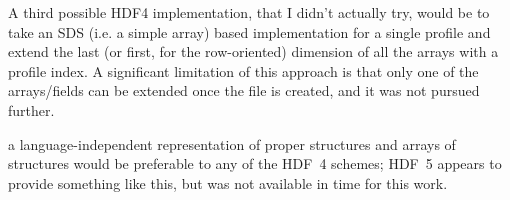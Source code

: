 \documentclass[12pt]{article}
\begin{document}
A third possible HDF4 implementation, that I didn't actually try,
would be to take an SDS (i.e. a simple array) based implementation
for a single profile and extend the last (or first, for the
row-oriented) dimension of all the arrays with a profile index.  A
significant limitation of this approach is that only one of the
arrays/fields can be extended once the file is created, and it was
not pursued further.

a language-independent representation of proper structures and
arrays of structures would be preferable to any of the HDF~4
schemes; HDF~5 appears to provide something like this, but was not
available in time for this work.
\end{document}
